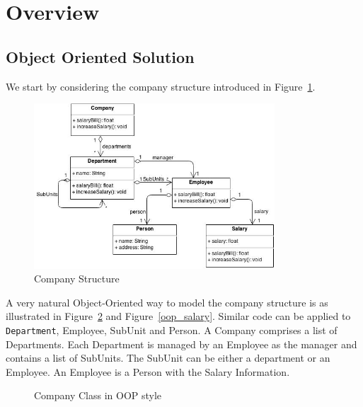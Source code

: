 \section{Overview}\label{subsec:overview}


\subsection{Object Oriented Solution}


We start by considering the company structure introduced in
Figure~\ref{company_structure}.

\begin{figure}[ht!]
\centering
\includegraphics[width=90mm]{Company.jpg}
\caption{Company Structure \label{company_structure}}
\end{figure}

A very natural Object-Oriented way to model the company structure is
as illustrated in Figure~\ref{oop_company} and
Figure~\ref{oop_salary}. Similar code can be applied to
\lstinline{Department},
Employee, SubUnit and Person. A Company comprises a list of
Departments. Each Department is managed by an Employee as the manager
and contains a list of SubUnits. The SubUnit can be either a
department or an Employee. An Employee is a Person with the Salary
Information.

\begin{figure}[tb]
\vspace{-.1in}
\caption{Company Class in OOP style}
\label{oop_company}
\end{figure}

